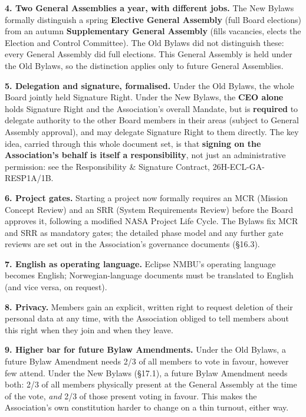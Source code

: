 \documentclass{../../../Common/Latex/Templates/rapport}
\begin{document}
\textbf{4. Two General Assemblies a year, with different jobs.} The New Bylaws formally distinguish a spring \textbf{Elective General Assembly} (full Board elections) from an autumn \textbf{Supplementary General Assembly} (fills vacancies, elects the Election and Control Committee). The Old Bylaws did not distinguish these: every General Assembly did full elections. This General Assembly is held under the Old Bylaws, so the distinction applies only to future General Assemblies.

\textbf{5. Delegation and signature, formalised.} Under the Old Bylaws, the whole Board jointly held Signature Right. Under the New Bylaws, the \textbf{CEO alone} holds Signature Right and the Association's overall Mandate, but is \textbf{required} to delegate authority to the other Board members in their areas (subject to General Assembly approval), and may delegate Signature Right to them directly. The key idea, carried through this whole document set, is that \textbf{signing on the Association's behalf is itself a responsibility}, not just an administrative permission: see the Responsibility \& Signature Contract, 26H-ECL-GA-RESP1A/1B.

\textbf{6. Project gates.} Starting a project now formally requires an MCR (Mission Concept Review) and an SRR (System Requirements Review) before the Board approves it, following a modified NASA Project Life Cycle. The Bylaws fix MCR and SRR as mandatory gates; the detailed phase model and any further gate reviews are set out in the Association's governance documents (\S16.3).

\textbf{7. English as operating language.} Eclipse NMBU's operating language becomes English; Norwegian-language documents must be translated to English (and vice versa, on request).

\textbf{8. Privacy.} Members gain an explicit, written right to request deletion of their personal data at any time, with the Association obliged to tell members about this right when they join and when they leave.

\textbf{9. Higher bar for future Bylaw Amendments.} Under the Old Bylaws, a future Bylaw Amendment needs 2/3 of all members to vote in favour, however few attend. Under the New Bylaws (\S17.1), a future Bylaw Amendment needs both: 2/3 of all members physically present at the General Assembly at the time of the vote, \emph{and} 2/3 of those present voting in favour. This makes the Association's own constitution harder to change on a thin turnout, either way.
\end{document}
